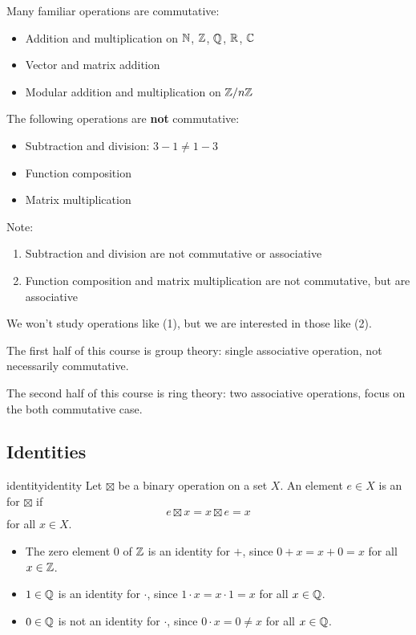 \documentclass[12pt,letterpaper]{report}
\begin{document}
Many familiar operations are commutative:
\begin{itemize}
  \item
  Addition and multiplication on $\mathbb{N}$, $\mathbb{Z}$, $\mathbb{Q}$, $\mathbb{R}$,
  $\mathbb{C}$
  \item
  Vector and matrix addition
  \item
  Modular addition and multiplication on $\mathbb{Z}/{n}\mathbb{Z}$
\end{itemize}
The following operations are \textbf{not} commutative:
\begin{itemize}
  \item Subtraction and division: $3 - 1 \neq 1 - 3$
  \item Function composition
  \item Matrix multiplication
\end{itemize}

Note:
\begin{enumerate}
  \item Subtraction and division are not commutative or associative
  \item Function composition and matrix multiplication are not commutative, but are associative
\end{enumerate}
We won't study operations like (1), but we are interested in those like (2).

The first half of this course is group theory: single associative operation, not necessarily
commutative.

The second half of this course is ring theory: two associative operations, focus on the both
commutative case.

\pagebreak
\subsection{Identities}

\begin{defn}{identity}{identity}
  Let $\boxtimes$ be a binary operation on a set $X$.
  An element $e \in X$ is an  for $\boxtimes$ if
  \[ e \boxtimes x = x \boxtimes e = x \]
  for all $x \in X$.
\end{defn}

\begin{ex}
  \begin{itemize}
    \item
    The zero element $0$ of $\mathbb{Z}$ is an identity for $+$, since $0 + x = x + 0 = x$ for all
    $x \in \mathbb{Z}$.
    \item
    $1 \in \mathbb{Q}$ is an identity for $\cdot$, since $1 \cdot x = x \cdot 1 = x$ for all
    $x \in \mathbb{Q}$.
    \item
    $0 \in \mathbb{Q}$ is not an identity for $\cdot$, since $0 \cdot x = 0 \neq x$ for all
    $x \in \mathbb{Q}$.
  \end{itemize}
\end{ex}
\end{document}
